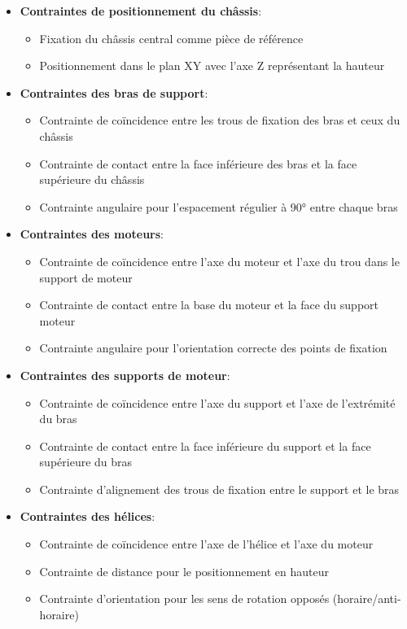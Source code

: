 \documentclass[a4paper,12pt]{report}
\begin{document}
\begin{itemize}
    \item \textbf{Contraintes de positionnement du châssis}:
    \begin{itemize}
        \item Fixation du châssis central comme pièce de référence
        \item Positionnement dans le plan XY avec l'axe Z représentant la hauteur
    \end{itemize}
    
    \item \textbf{Contraintes des bras de support}:
    \begin{itemize}
        \item Contrainte de coïncidence entre les trous de fixation des bras et ceux du châssis
        \item Contrainte de contact entre la face inférieure des bras et la face supérieure du châssis
        \item Contrainte angulaire pour l'espacement régulier à 90° entre chaque bras
    \end{itemize}
    
    \item \textbf{Contraintes des moteurs}:
    \begin{itemize}
        \item Contrainte de coïncidence entre l'axe du moteur et l'axe du trou dans le support de moteur
        \item Contrainte de contact entre la base du moteur et la face du support moteur
        \item Contrainte angulaire pour l'orientation correcte des points de fixation
    \end{itemize}
    
    \item \textbf{Contraintes des supports de moteur}:
    \begin{itemize}
        \item Contrainte de coïncidence entre l'axe du support et l'axe de l'extrémité du bras
        \item Contrainte de contact entre la face inférieure du support et la face supérieure du bras
        \item Contrainte d'alignement des trous de fixation entre le support et le bras
    \end{itemize}
    
    \item \textbf{Contraintes des hélices}:
    \begin{itemize}
        \item Contrainte de coïncidence entre l'axe de l'hélice et l'axe du moteur
        \item Contrainte de distance pour le positionnement en hauteur
        \item Contrainte d'orientation pour les sens de rotation opposés (horaire/anti-horaire)
    \end{itemize}
    

\end{itemize}
\end{document}
